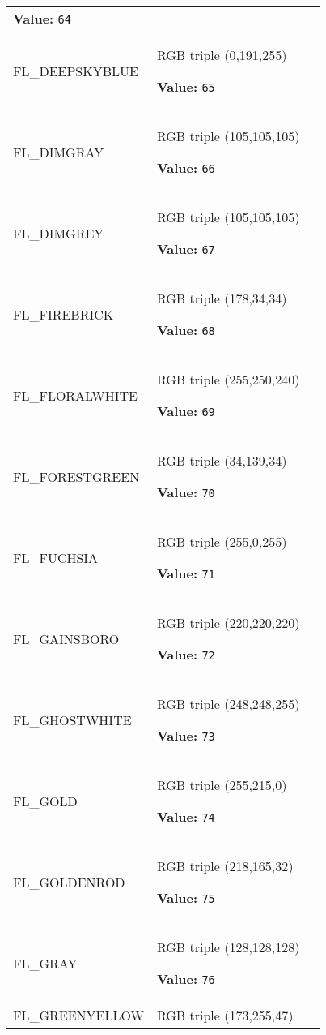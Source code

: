\begin{longtable}{|p{\varnamewidth}|p{\vardescrwidth}|l}
\textbf{Value:} 
{\tt 64}&\\
\cline{1-2}
\raggedright F\-L\-\_\-D\-E\-E\-P\-S\-K\-Y\-B\-L\-U\-E\- & \raggedright RGB triple (0,191,255)

\textbf{Value:} 
{\tt 65}&\\
\cline{1-2}
\raggedright F\-L\-\_\-D\-I\-M\-G\-R\-A\-Y\- & \raggedright RGB triple (105,105,105)

\textbf{Value:} 
{\tt 66}&\\
\cline{1-2}
\raggedright F\-L\-\_\-D\-I\-M\-G\-R\-E\-Y\- & \raggedright RGB triple (105,105,105)

\textbf{Value:} 
{\tt 67}&\\
\cline{1-2}
\raggedright F\-L\-\_\-F\-I\-R\-E\-B\-R\-I\-C\-K\- & \raggedright RGB triple (178,34,34)

\textbf{Value:} 
{\tt 68}&\\
\cline{1-2}
\raggedright F\-L\-\_\-F\-L\-O\-R\-A\-L\-W\-H\-I\-T\-E\- & \raggedright RGB triple (255,250,240)

\textbf{Value:} 
{\tt 69}&\\
\cline{1-2}
\raggedright F\-L\-\_\-F\-O\-R\-E\-S\-T\-G\-R\-E\-E\-N\- & \raggedright RGB triple (34,139,34)

\textbf{Value:} 
{\tt 70}&\\
\cline{1-2}
\raggedright F\-L\-\_\-F\-U\-C\-H\-S\-I\-A\- & \raggedright RGB triple (255,0,255)

\textbf{Value:} 
{\tt 71}&\\
\cline{1-2}
\raggedright F\-L\-\_\-G\-A\-I\-N\-S\-B\-O\-R\-O\- & \raggedright RGB triple (220,220,220)

\textbf{Value:} 
{\tt 72}&\\
\cline{1-2}
\raggedright F\-L\-\_\-G\-H\-O\-S\-T\-W\-H\-I\-T\-E\- & \raggedright RGB triple (248,248,255)

\textbf{Value:} 
{\tt 73}&\\
\cline{1-2}
\raggedright F\-L\-\_\-G\-O\-L\-D\- & \raggedright RGB triple (255,215,0)

\textbf{Value:} 
{\tt 74}&\\
\cline{1-2}
\raggedright F\-L\-\_\-G\-O\-L\-D\-E\-N\-R\-O\-D\- & \raggedright RGB triple (218,165,32)

\textbf{Value:} 
{\tt 75}&\\
\cline{1-2}
\raggedright F\-L\-\_\-G\-R\-A\-Y\- & \raggedright RGB triple (128,128,128)

\textbf{Value:} 
{\tt 76}&\\
\cline{1-2}
\raggedright F\-L\-\_\-G\-R\-E\-E\-N\-Y\-E\-L\-L\-O\-W\- & \raggedright RGB triple (173,255,47)


\end{longtable}
